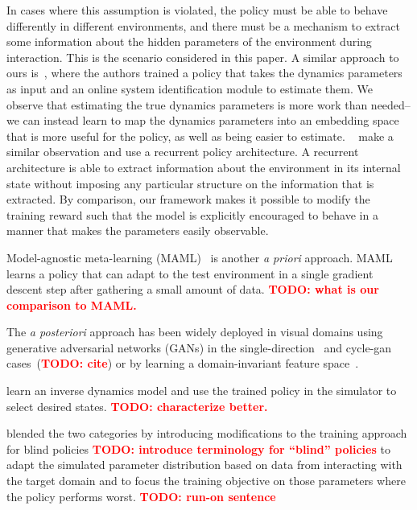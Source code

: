 \documentclass{article}
\newcommand{\TODO}[1]{\textcolor{red}{\textbf{TODO: #1}}}
\begin{document}
In cases where this assumption is violated, the policy must be able to behave differently in different environments,
and there must be a mechanism to extract some information about the hidden parameters of the environment during interaction.
This is the scenario considered in this paper.
A similar approach to ours is~\citet{yu-up-osi-rss17},
where the authors trained a policy that takes the dynamics parameters as input
and an online system identification module to estimate them.
We observe that estimating the true dynamics parameters is more work than needed--
we can instead learn to map the dynamics parameters into an embedding space
that is more useful for the policy, as well as being easier to estimate.
~\citet{peng-dynamics-randomization-corr17} make a similar observation and use a recurrent policy architecture.
A recurrent architecture is able to extract information about the environment in its internal state without imposing any particular structure on the information that is extracted.
By comparison, our framework makes it possible to modify the training reward such that the model is explicitly encouraged to behave in a manner that makes the parameters easily observable.

Model-agnostic meta-learning (MAML)~\citep{finn-maml-icml17} is another \emph{a priori} approach.
MAML learns a policy that can adapt to the test environment in a single gradient descent step after gathering a small amount of data.
\TODO{what is our comparison to MAML.}



The \emph{a posteriori} approach has been widely deployed in visual domains
using generative adversarial networks (GANs) in the single-direction~\citep{bousmalis-domain-gan-cvpr17}
and cycle-gan cases~(\TODO{cite})
or by learning a domain-invariant feature space~\citep{bousmalis-domainseparation-nips16}.

\citet{christiano-deep-inverse-dynamics-corr16} learn an inverse dynamics model and use the trained policy in the simulator to select desired states.
\TODO{characterize better.}

\citet{rajeswaran-epopt-corr16} blended the two categories by introducing
modifications to the training approach for blind policies
\TODO{introduce terminology for ``blind'' policies}
to adapt the simulated parameter distribution based on data from interacting with the target domain
and to focus the training objective on those parameters where the policy performs worst.
\TODO{run-on sentence}
\end{document}
